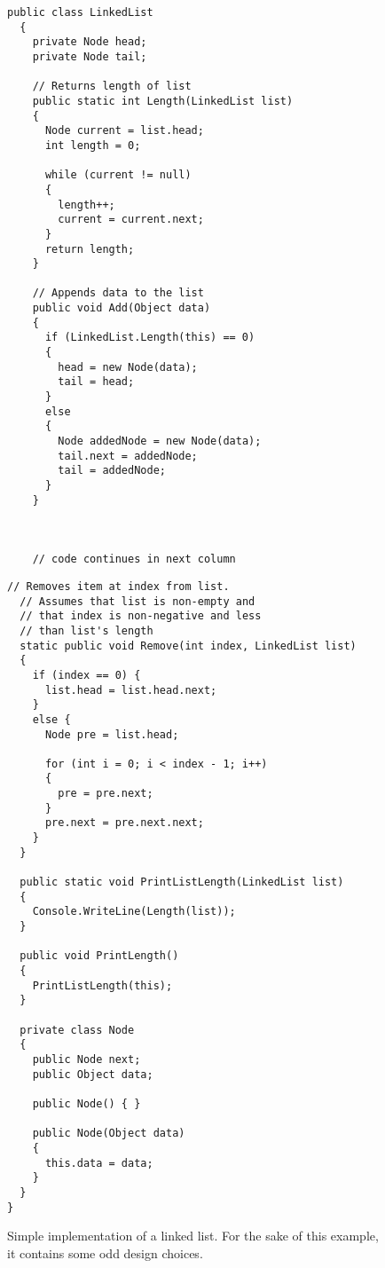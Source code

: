 \documentclass[a4paper,12pt]{article}
\begin{document}
\begin{figure}[H]
  \centering
  \begin{minipage}[t]{0.52\linewidth}
    \begin{lstlisting}[basicstyle={\fontsize{8}{9}\ttfamily}]
  public class LinkedList
  {
    private Node head;
    private Node tail;

    // Returns length of list
    public static int Length(LinkedList list)
    {
      Node current = list.head;
      int length = 0;

      while (current != null)
      {
        length++;
        current = current.next;
      }
      return length;
    }

    // Appends data to the list
    public void Add(Object data)
    {
      if (LinkedList.Length(this) == 0)
      {
        head = new Node(data);
        tail = head;
      }
      else
      {
        Node addedNode = new Node(data);
        tail.next = addedNode;
        tail = addedNode;
      }
    }



    // code continues in next column
    \end{lstlisting}
  \end{minipage}
  \begin{minipage}[t]{0.46\linewidth}
    \begin{lstlisting}[basicstyle={\fontsize{8}{9}\ttfamily}]
  // Removes item at index from list.
  // Assumes that list is non-empty and
  // that index is non-negative and less
  // than list's length
  static public void Remove(int index, LinkedList list)
  {
    if (index == 0) {
      list.head = list.head.next;
    }
    else {
      Node pre = list.head;

      for (int i = 0; i < index - 1; i++)
      {
        pre = pre.next;
      }
      pre.next = pre.next.next;
    }
  }

  public static void PrintListLength(LinkedList list)
  {
    Console.WriteLine(Length(list));
  }

  public void PrintLength()
  {
    PrintListLength(this);
  }

  private class Node
  {
    public Node next;
    public Object data;

    public Node() { }

    public Node(Object data)
    {
      this.data = data;
    }
  }
}
    \end{lstlisting}
  \end{minipage}
  \caption{Simple implementation of a linked list. For the sake of this example, it contains some odd design choices.}
  \label{fig:example-code}
\end{figure}
\end{document}
